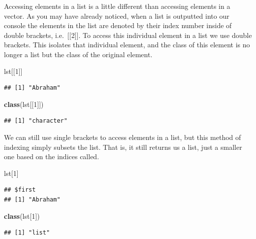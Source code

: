 \documentclass[
]{book}
\newenvironment{Shaded}{\begin{snugshade}}{\end{snugshade}}
\newcommand{\DecValTok}[1]{\textcolor[rgb]{0.00,0.00,0.81}{#1}}
\newcommand{\KeywordTok}[1]{\textcolor[rgb]{0.13,0.29,0.53}{\textbf{#1}}}
\newcommand{\NormalTok}[1]{#1}
\begin{document}
Accessing elements in a list is a little different than accessing elements in a vector. As you may have already noticed, when a list is outputted into our console the elements in the list are denoted by their index number inside of double brackets, i.e.~{[}{[}2{]}{]}. To access this individual element in a list we use double brackets. This isolates that individual element, and the class of this element is no longer a list but the class of the original element.

\begin{Shaded}
\begin{Highlighting}[]
\NormalTok{lst[[}\DecValTok{1}\NormalTok{]]}
\end{Highlighting}
\end{Shaded}

\begin{verbatim}
## [1] "Abraham"
\end{verbatim}

\begin{Shaded}
\begin{Highlighting}[]
\KeywordTok{class}\NormalTok{(lst[[}\DecValTok{1}\NormalTok{]])}
\end{Highlighting}
\end{Shaded}

\begin{verbatim}
## [1] "character"
\end{verbatim}

We can still use single brackets to access elements in a list, but this method of indexing simply subsets the list. That is, it still returns us a list, just a smaller one based on the indices called.

\begin{Shaded}
\begin{Highlighting}[]
\NormalTok{lst[}\DecValTok{1}\NormalTok{]}
\end{Highlighting}
\end{Shaded}

\begin{verbatim}
## $first
## [1] "Abraham"
\end{verbatim}

\begin{Shaded}
\begin{Highlighting}[]
\KeywordTok{class}\NormalTok{(lst[}\DecValTok{1}\NormalTok{])}
\end{Highlighting}
\end{Shaded}

\begin{verbatim}
## [1] "list"
\end{verbatim}
\end{document}
